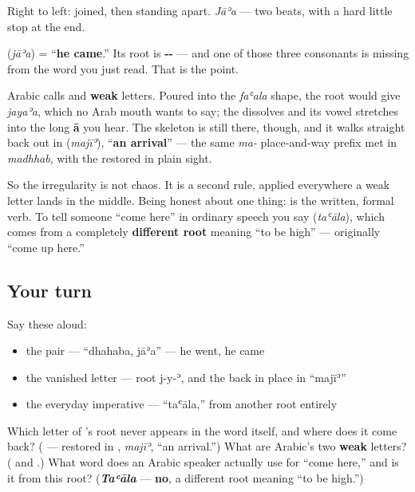 Right to left: \textbf{} joined, then \textbf{} standing apart. \emph{Jāʾa} — two beats, with a hard little stop at the end.

\begin{cousinweb}
\textbf{} (\emph{jāʾa}) = \textquotedblleft{}\textbf{he came}.\textquotedblright{} Its root is \textbf{--} — and one of those three consonants is missing from the word you just read. That is the point.

Arabic calls \textbf{} and \textbf{} \textbf{weak} letters. Poured into the \emph{faʿala} shape, the root would give \emph{jayaʾa}, which no Arab mouth wants to say; the \textbf{} dissolves and its vowel stretches into the long \textbf{ā} you hear. The skeleton is still there, though, and it walks straight back out in \textbf{} (\emph{majīʾ}), \textquotedblleft{}\textbf{an arrival}\textquotedblright{} — the same \emph{ma-} place-and-way prefix met in \emph{madhhab}, with the \textbf{} restored in plain sight.

So the irregularity is not chaos. It is a second rule, applied everywhere a weak letter lands in the middle. Being honest about one thing: \textbf{} is the written, formal verb. To tell someone \textquotedblleft{}come here\textquotedblright{} in ordinary speech you say \textbf{} (\emph{taʿāla}), which comes from a completely \textbf{different root} meaning \textquotedblleft{}to be high\textquotedblright{} — originally \textquotedblleft{}come up here.\textquotedblright{}
\end{cousinweb}

\subsection*{Your turn}
Say these aloud:

\begin{itemize}
\raggedright
  \item the pair — \textquotedblleft{}dhahaba, jāʾa\textquotedblright{} — he went, he came
  \item the vanished letter — root j-y-ʾ, and the  back in place in \textquotedblleft{}majīʾ\textquotedblright{}
  \item the everyday imperative — \textquotedblleft{}taʿāla,\textquotedblright{} from another root entirely
\end{itemize}

\begin{tcolorbox}[breakable,colback=teal!4,colframe=teal!35!black,title={Before you move on}]
Which letter of \textbf{}'s root never appears in the word itself, and where does it come back? (\textbf{} — restored in \textbf{}, \emph{majīʾ}, \textquotedblleft{}an arrival.\textquotedblright{}) What are Arabic's two \textbf{weak} letters? (\textbf{} and \textbf{}.) What word does an Arabic speaker actually use for \textquotedblleft{}come here,\textquotedblright{} and is it from this root? (\emph{\textbf{Taʿāla}} — \textbf{no}, a different root meaning \textquotedblleft{}to be high.\textquotedblright{})
\end{tcolorbox}
